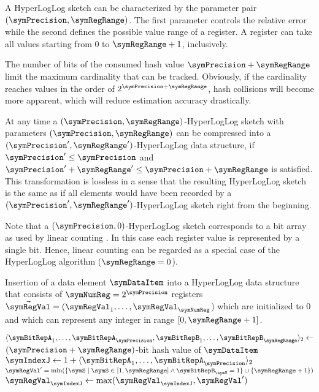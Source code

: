 \documentclass[a4paper]{scrartcl}
\begin{document}
A HyperLogLog sketch can be characterized by the parameter pair $(\symPrecision, \symRegRange)$. The first parameter controls the relative error while the second defines the possible value range of a register. A register can take all values starting from 0 to $\symRegRange+1$, inclusively. 

The number of bits of the consumed hash value $\symPrecision+\symRegRange$ limit the maximum cardinality that can be tracked. Obviously, if the cardinality reaches values in the order of $2^{\symPrecision+\symRegRange}$, hash collisions will become more apparent, which will reduce estimation accuracy drastically.

At any time a $(\symPrecision, \symRegRange)$-HyperLogLog sketch with parameters $(\symPrecision, \symRegRange)$ can be compressed into a $(\symPrecision', \symRegRange')$-HyperLogLog data structure, if $\symPrecision'\leq\symPrecision$ and $\symPrecision'+\symRegRange' \leq\symPrecision + \symRegRange$ is satisfied. This transformation is lossless in a sense that the resulting HyperLogLog sketch is the same as if all elements would have been recorded by a $(\symPrecision', \symRegRange')$-HyperLogLog sketch right from the beginning.

Note that a $(\symPrecision, 0)$-HyperLogLog sketch corresponds to a bit array as used by linear counting \cite{Whang1990}. In this case each register value is represented by a single bit. Hence, linear counting can be regarded as a special case of the HyperLogLog algorithm ($\symRegRange = 0$).

\begin{algorithm}
\caption{Insertion of a data element $\symDataItem$ into a HyperLogLog data structure that consists of $\symNumReg=2^\symPrecision$ registers $\vec{\symRegVal} = (\symRegVal_1,\ldots,\symRegVal_\symNumReg$) which are initialized to 0 and which can represent any integer in range $[0, \symRegRange+1]$.}
\label{alg:insert}
\begin{algorithmic}
\State $\langle \symBitRepA_1, \ldots, \symBitRepA_\symPrecision,\symBitRepB_1,\ldots,\symBitRepB_\symRegRange\rangle_2 \gets$ $(\symPrecision + \symRegRange)$-bit hash value of $\symDataItem$
\State $\symIndexJ \gets 1+ \langle \symBitRepA_1, \ldots, \symBitRepA_\symPrecision\rangle_2$
\State $\symRegVal' = \min(\{\symS\mid \symS \in [1, \symRegRange]  \wedge  \symBitRepB_\symS = 1\}\cup {\{\symRegRange+1\}} )$
\State $\symRegVal_\symIndexJ \gets\max(\symRegVal_\symIndexJ, \symRegVal')$
\EndProcedure
\end{algorithmic}
\end{algorithm}
\end{document}
